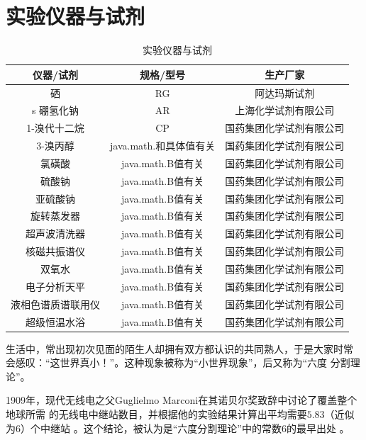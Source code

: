 \documentclass[bachelor,adobefonts]{jnuthesis} %
\begin{document}
    \section{实验仪器与试剂}
        \begin{table}[htp]
        \centering
        \begin{tabular}{ccc}
            \toprule
            \textbf{仪器/试剂} & \textbf{规格/型号} & \textbf{生产厂家} \\
            \midrule
            硒   &  RG  & 阿达玛斯试剂 \\
s          硼氢化钠  & AR  & 上海化学试剂有限公司 \\
            1-溴代十二烷  & CP & 国药集团化学试剂有限公司 \\
            3-溴丙醇 & java.math.和具体值有关 & 国药集团化学试剂有限公司 \\
            氯磺酸  & java.math.B值有关 & 国药集团化学试剂有限公司 \\
            硫酸钠  & java.math.B值有关 & 国药集团化学试剂有限公司 \\
            亚硫酸钠  & java.math.B值有关 & 国药集团化学试剂有限公司 \\
            旋转蒸发器  & java.math.B值有关 & 国药集团化学试剂有限公司 \\
            超声波清洗器  & java.math.B值有关 & 国药集团化学试剂有限公司 \\
            核磁共振谱仪  & java.math.B值有关 & 国药集团化学试剂有限公司 \\
            双氧水  & java.math.B值有关 & 国药集团化学试剂有限公司 \\
            电子分析天平  & java.math.B值有关 & 国药集团化学试剂有限公司 \\
            液相色谱质谱联用仪  & java.math.B值有关 & 国药集团化学试剂有限公司 \\
            超级恒温水浴  & java.math.B值有关 & 国药集团化学试剂有限公司 \\
            \bottomrule
        \end{tabular}
        \caption{实验仪器与试剂}\label{table:实验仪器与试剂}
    \end{table}
    生活中，常出现初次见面的陌生人却拥有双方都认识的共同熟人，于是大家时常
    会感叹：“这世界真小！”。这种现象被称为``小世界现象''，后又称为``六度
    分割理论''。
    
    1909年，现代无线电之父Guglielmo Marconi在其诺贝尔奖致辞中讨论了覆盖整个地球所需
    的无线电中继站数目，并根据他的实验结果计算出平均需要$5.83$（近似为$6$）个中继站
    \cite{marconi1909nobel}。这个结论，被认为是``六度分割理论''中的常数$6$的最早出处
    \cite{barabasi2003linked}。
    
\end{document}
